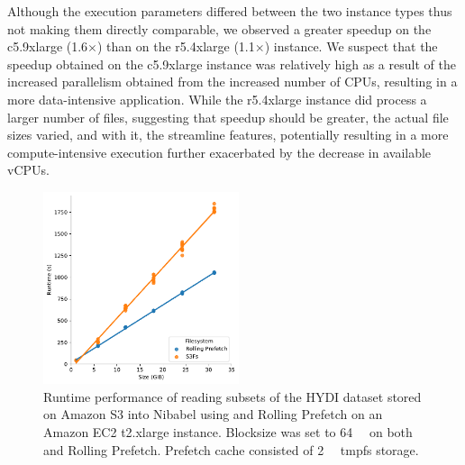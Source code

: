 Although the execution parameters differed between the two instance types thus not
making them directly comparable, we observed a greater speedup on the c5.9xlarge
(1.6$\times$) than on the r5.4xlarge (1.1$\times$) instance. We suspect that the speedup obtained
on the c5.9xlarge instance was relatively high as a result of the increased parallelism
obtained from the increased number of CPUs, resulting in a more data-intensive application. While the r5.4xlarge instance did process a larger number of files, 
suggesting that speedup should be greater, the actual file sizes varied, and with
it, the streamline features, potentially resulting in a more compute-intensive
execution further exacerbated by the decrease in available vCPUs. 





\begin{figure}
\begin{center}
\includegraphics[height=160pt]{figures/part3-chp1/filesize.pdf}
\caption{Runtime performance of reading subsets of the HYDI dataset stored on Amazon S3 into Nibabel using \sfs and Rolling Prefetch on an Amazon EC2 t2.xlarge instance. Blocksize was set to \SI{64}{\mebi\byte} on both \sfs and
Rolling Prefetch. Prefetch cache consisted of \SI{2}{\gibi\byte} tmpfs storage.}
\label{fig:filesize}
\end{center}
\end{figure}

